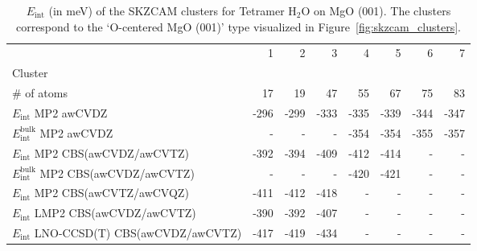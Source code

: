 \begin{table}
\caption{\label{tab:system_eint_mgo_h2o_tetramer}$E_\textrm{int}$ (in meV) of the SKZCAM clusters for Tetramer H$_2$O on MgO (001). The clusters correspond to the `O-centered MgO (001)' type visualized in Figure~\ref{fig:skzcam_clusters}.}
\begin{adjustbox}{center,max width=1.4\textwidth}
\begin{tabular}{lrrrrrrr}
\toprule
 & 1 & 2 & 3 & 4 & 5 & 6 & 7 \\ 
Cluster &  &  &  &  &  &  &  \\
\midrule
\# of atoms & 17 & 19 & 47 & 55 & 67 & 75 & 83 \\
$E_\textrm{int}$ MP2 awCVDZ & -296 & -299 & -333 & -335 & -339 & -344 & -347 \\
$E_\textrm{int}^\textrm{bulk}$ MP2 awCVDZ & - & - & - & -354 & -354 & -355 & -357 \\
$E_\textrm{int}$ MP2 CBS(awCVDZ/awCVTZ) & -392 & -394 & -409 & -412 & -414 & - & - \\
$E_\textrm{int}^\textrm{bulk}$ MP2 CBS(awCVDZ/awCVTZ) & - & - & - & -420 & -421 & - & - \\
$E_\textrm{int}$ MP2 CBS(awCVTZ/awCVQZ) & -411 & -412 & -418 & - & - & - & - \\
$E_\textrm{int}$ LMP2 CBS(awCVDZ/awCVTZ) & -390 & -392 & -407 & - & - & - & - \\
$E_\textrm{int}$ LNO-CCSD(T) CBS(awCVDZ/awCVTZ) & -417 & -419 & -434 & - & - & - & - \\
\bottomrule
\end{tabular}
\end{adjustbox}
\end{table}

